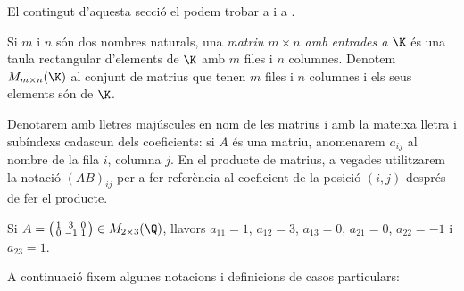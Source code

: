 El contingut d'aquesta secció el podem trobar a \cite[Tema 1]{Bret} i a \cite[Tema 2]{NaXa}.
\begin{definicio}
	Si $m$ i $n$ són dos nombres naturals, una \emph{matriu $m\times n$ amb entrades a $\K$} és una taula rectangular d'elements de $\K$ amb $m$ files i $n$ columnes. Denotem $M_{m\times n}(\K)$ al conjunt de matrius que tenen $m$ files i $n$ columnes i els seus elements són de $\K$.
\end{definicio}
\begin{notacio}
	Denotarem amb lletres majúscules en nom de les matrius i amb la mateixa lletra i subíndexs cadascun dels coeficients: si $A$ és una matriu, anomenarem $a_{ij}$ al nombre de la fila $i$, columna $j$. En el producte de matrius, a vegades utilitzarem la notació $(AB)_{ij}$ per a fer referència al coeficient de la posició $(i,j)$ després de fer el producte.
\end{notacio}
\begin{exemple}
	Si $A=\big(\begin{smallmatrix}
	1 & 3 & 0 \\ 0 & -1 & 1
	\end{smallmatrix}\big) \in M_{2\times3}(\Q)$, llavors $a_{11}=1$, $a_{12}=3$, $a_{13}=0$, $a_{21}=0$, $a_{22}=-1$ i $a_{23}=1$.
\end{exemple}
A continuació fixem algunes notacions i definicions de casos particulars:
